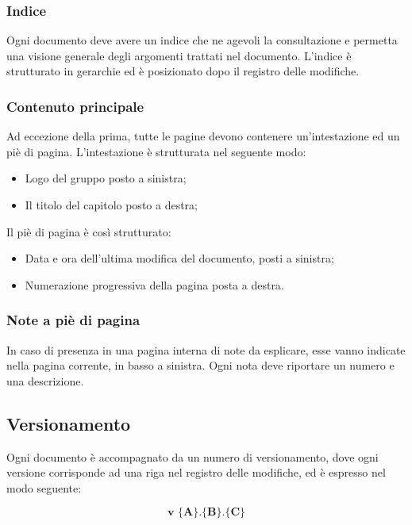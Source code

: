 \documentclass[../NormediProgetto.tex]{subfiles}
\begin{document}
\subsubsection{Indice}

Ogni documento deve avere un indice che ne agevoli la consultazione e permetta una visione generale degli argomenti trattati nel documento. L'indice è strutturato in gerarchie ed è posizionato dopo il registro delle modifiche.

\subsubsection{Contenuto principale}

 Ad eccezione della prima, tutte le pagine devono contenere un’intestazione ed un piè di pagina. L’intestazione è strutturata nel seguente modo: 

\begin{itemize}
\item Logo del gruppo posto a sinistra;
\item Il titolo del capitolo posto a destra;
\end{itemize}

Il piè di pagina è così strutturato:

\begin{itemize}
\item Data e ora dell'ultima modifica del documento, posti a sinistra;
\item Numerazione progressiva della pagina posta a destra.
\end{itemize}

\subsubsection{Note a piè di pagina}

In caso di presenza in una pagina interna di note da esplicare, esse vanno indicate nella pagina corrente, in basso a sinistra. Ogni nota deve riportare un numero e una descrizione.

\subsection{Versionamento}

Ogni documento è accompagnato da un numero di versionamento, dove ogni versione corrisponde ad una riga nel registro delle modifiche, ed è espresso nel modo seguente:

\[\textbf{v $\biggl\{$A$\biggr\}$.$\biggl\{$B$\biggr\}$.$\biggl\{$C$\biggr\}$}\]
\end{document}
